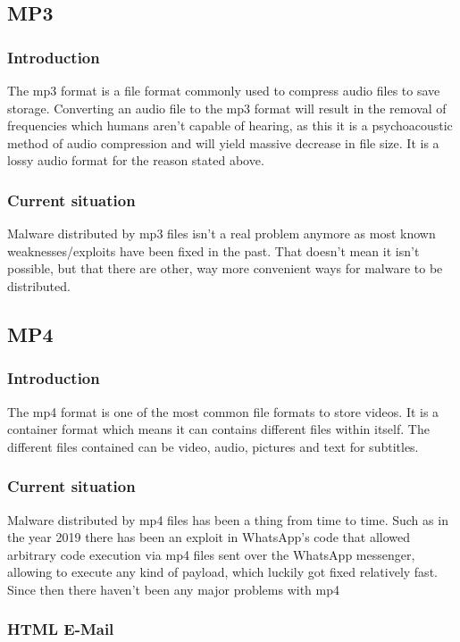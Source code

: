 \documentclass[a4paper,10pt]{article}
\begin{document}
\subsection{MP3}
\subsubsection{Introduction}
The mp3 format is a file format commonly used to compress audio files to save storage. Converting an audio file to the mp3 format will result in the removal of frequencies which humans aren't capable of hearing, as this it is a psychoacoustic method of audio compression and will yield massive decrease in file size. It is a lossy audio format for the reason stated above.

\subsubsection{Current situation}
Malware distributed by mp3 files isn't a real problem anymore as most known weaknesses/exploits have been fixed in the past. That doesn't mean it isn't possible, but that there are other, way more convenient ways for malware to be distributed.


\subsection{MP4}
\subsubsection{Introduction}
The mp4 format is one of the most common file formats to store videos. It is a container format which means it can contains different files within itself. The different files contained can be video, audio, pictures and text for subtitles.
\subsubsection{Current situation}
Malware distributed by mp4 files has been a thing from time to time. Such as in the year 2019 there has been an exploit in WhatsApp's code that allowed arbitrary code execution via mp4 files sent over the WhatsApp messenger, allowing to execute any kind of payload, which luckily got fixed relatively fast. Since then there haven't been any major problems with mp4

\subsubsection{HTML E-Mail}
\end{document}
